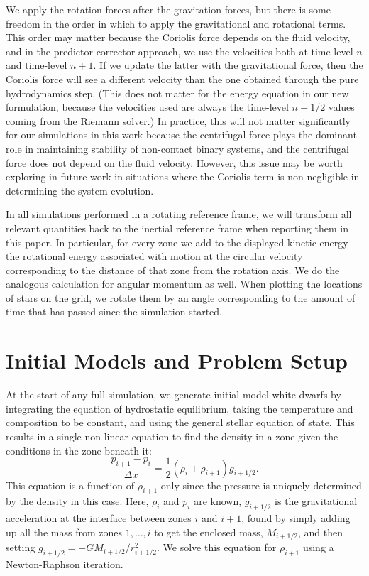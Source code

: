 \documentclass{emulateapj}
\begin{document}
We apply the rotation forces after the gravitation forces, but 
there is some freedom in the order in which to apply the gravitational and rotational terms.
This order may matter because the Coriolis force depends on the fluid velocity, and 
in the predictor-corrector approach, we use the velocities both at 
time-level $n$ and time-level $n+1$. If we update the latter with the gravitational force, 
then the Coriolis force will see a different velocity than the one obtained through the 
pure hydrodynamics step. (This does not matter for the energy equation in our new formulation,
because the velocities used are always the time-level $n+1/2$ values coming from the Riemann solver.)
In practice, this will not matter significantly for our simulations in this work 
because the centrifugal force plays the dominant role in maintaining stability of non-contact 
binary systems, and the centrifugal force does not depend on the fluid velocity.
However, this issue may be worth exploring in future work in situations where the Coriolis 
term is non-negligible in determining the system evolution.

In all simulations performed in a rotating reference frame, we will transform all relevant
quantities back to the inertial reference frame when reporting them in this paper. In particular,
for every zone we add to the displayed kinetic energy the rotational energy associated with motion 
at the circular velocity corresponding to the distance of that zone from the rotation axis.
We do the analogous calculation for angular momentum as well. When plotting the locations of 
stars on the grid, we rotate them by an angle corresponding to the amount of time that has 
passed since the simulation started.


\section{Initial Models and Problem Setup}
\label{sec:initial_models}

At the start of any full simulation, we generate initial model white
dwarfs by integrating the equation of hydrostatic equilibrium, taking
the temperature and composition to be constant, and using the general
stellar equation of state.  This results in a single non-linear
equation to find the density in a zone given the conditions in the
zone beneath it:
\begin{equation}
\frac{p_{i+1} - p_i}{\Delta x} = \frac{1}{2} (\rho_i + \rho_{i+1}) g_{i+1/2}.
\end{equation}
This equation is a function of $\rho_{i+1}$ only since the pressure is
uniquely determined by the density in this case. Here, $\rho_i$ and $p_i$
are known, $g_{i+1/2}$ is the gravitational acceleration at the
interface between zones $i$ and $i+1$, found by simply adding up all
the mass from zones $1, \ldots, i$ to get the enclosed mass,
$M_{i+1/2}$, and then setting $g_{i+1/2} =
-GM_{i+1/2}/r_{i+1/2}^2$. We solve this equation for $\rho_{i+1}$
using a Newton-Raphson iteration.
\end{document}
